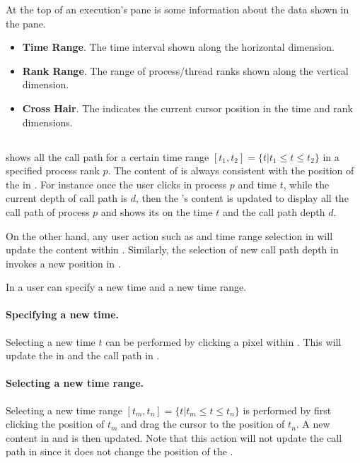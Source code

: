At the top of an execution's \traceview{} pane is some information about the data shown in the pane.
\begin{itemize}
 \item \textbf{Time Range}. The time interval shown along the horizontal dimension. 
 \item \textbf{Rank Range}. The range of process/thread ranks shown along the vertical dimension. 
 \item \textbf{Cross Hair}. The \crosshair{} indicates the current cursor position in the time and rank dimensions. 
\end{itemize}

\subsection{\depthview}
\label{sec:depthview}

\depthview{} shows all the call path for a certain time range $[t_1,t_2]= \{t | t_1\leq t\leq t_2\}$ in a specified process rank $p$. The content of \depthview{} is always consistent with the position of the \crosshair{} in \traceview{}.
For instance once the user clicks in process $p$ and time $t$, while the current depth of call path is $d$, then the \depthview's content is updated to display all the call path of process $p$ and shows its \crosshair{} on the time $t$ and the call path depth $d$.

On the other hand, any user action such as \crosshair{} and time range selection in \depthview{} will update the content within \traceview. Similarly, the selection of new call path depth in \callview{} invokes a new position in \depthview.

In \depthview{} a user can specify a new \crosshair{} time and a new time range.
\paragraph{Specifying a new \crosshair{} time.} Selecting a new \crosshair{} time $t$ can be performed by clicking a pixel within \depthview{}. This will update the \crosshair{} in \traceview{} and the call path in \callview.

\paragraph{Selecting a new time range.} Selecting a new time range $[t_m,t_n]= \{t | t_m\leq t\leq t_n\}$ is performed by first clicking the position of $t_m$ and drag the cursor to the position of $t_n$. A new content in \depthview{} and \traceview{} is then updated. Note that this action will not update the call path in \callview{} since it does not change the position of the \crosshair.


